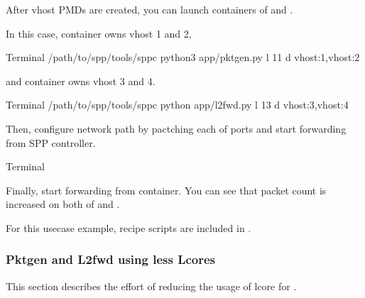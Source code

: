 \documentclass[a4paper,11pt,openany,oneside,english]{sphinxmanual}
\begin{document}
After vhost PMDs are created, you can launch containers
of  and .

In this case,  container owns vhost 1 and 2,

\begin{sphinxVerbatim}[commandchars=\\\{\},formatcom=\footnotesize]
 Terminal 
  /path/to/spp/tools/sppc
 python3 app/pktgen.py \PYGZhy{}l \PYGZhy{}11 \PYGZhy{}d vhost:1,vhost:2
\end{sphinxVerbatim}

and  container owns vhost 3 and 4.

\begin{sphinxVerbatim}[commandchars=\\\{\},formatcom=\footnotesize]
 Terminal 
  /path/to/spp/tools/sppc
 python app/l2fwd.py \PYGZhy{}l \PYGZhy{}13 \PYGZhy{}d vhost:3,vhost:4
\end{sphinxVerbatim}

Then, configure network path by pactching each of ports
and start forwarding from SPP controller.

\begin{sphinxVerbatim}[commandchars=\\\{\},formatcom=\footnotesize]
 Terminal 
\end{sphinxVerbatim}

Finally, start forwarding from  container.
You can see that packet count is increased on both of
 and .

For this usecase example, recipe scripts are included in
.


\subsubsection{Pktgen and L2fwd using less Lcores}
\label{\detokenize{tools/sppc/usecases:pktgen-and-l2fwd-using-less-lcores}}\label{\detokenize{tools/sppc/usecases:sppc-usecases-pktgen-l2fwd-less-lcores}}
This section describes the effort of reducing the usage of lcore for
{\hyperref[\detokenize{tools/sppc/usecases:sppc-usecases-pktgen-l2fwd}]{}}.
\end{document}
